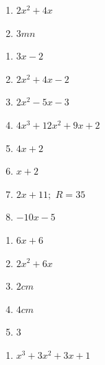 \begin{respostas}{2}
\begin{multicols}{3}
\begin{enumerate}[label=\alph*)]
            \item $2x^2+4x$
            
            \item $3mn$
        \end{enumerate}
    \end{multicols}
    
    \ansitem{} \begin{multicols}{3}
        \begin{enumerate}[label=\alph*)]
            \item $3x-2$
            
            \item $2x^2+4x-2$
            
            \item $2x^2-5x-3$
            
            \item $4x^3 + 12x^2 + 9x+2$
            
            \item $4x+2$
            
            \item $x+2$
            
            \item $2x+11;$ $R=35$
            
            \item $-10x-5$
        \end{enumerate}
    \end{multicols}
    
    \ansitem{} \begin{multicols}{5}
        \begin{enumerate}[label=\alph*)]
            \item $6x+6$
            
            \item $2x^2+6x$
            
            \item $2cm$
            
            \item $4cm$
            
            \item $3$
        \end{enumerate}
    \end{multicols}
    
    
    \ansitem{} \begin{multicols}{3}
        \begin{enumerate}[label=\alph*)]
            \item $x^3+3x^2+3x+1$
            

\end{enumerate}
\end{multicols}
\end{respostas}
